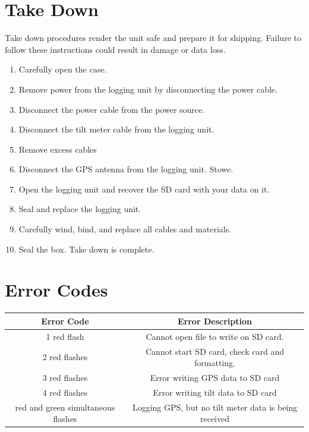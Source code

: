 \documentclass[11pt]{article} %
\begin{document}
\newpage
\section{Take Down}
Take down procedures render the unit safe and prepare it for shipping. Failure to follow these instructions could result in damage or data loss.

\begin{enumerate}
\item Carefully open the case.
\item Remove power from the logging unit by disconnecting the power cable.
\item Disconnect the power cable from the power source.
\item Disconnect the tilt meter cable from the logging unit.
\item Remove excess cables
\item Disconnect the GPS antenna from the logging unit. Stowe.
\item Open the logging unit and recover the SD card with your data on it.
\item Seal and replace the logging unit.
\item Carefully wind, bind, and replace all cables and materials.
\item Seal the box. Take down is complete.
\end{enumerate}

\newpage
\section{Error Codes}

\begin{center}
    \begin{tabular}{ |c|c|}
    \hline
    Error Code & Error Description\\
    \hline
    1 red flash &  Cannot open file to write on SD card.\\
    \hline
    2 red flashes &  Cannot start SD card, check card and formatting.\\
    \hline
    3 red flashes &  Error writing GPS data to SD card\\
    \hline
    4 red flashes &  Error writing tilt data to SD card\\
    \hline
    red and green simultaneous flashes &  Logging GPS, but no tilt meter data is being received\\
    \hline
    \end{tabular}
\end{center}
\end{document}
